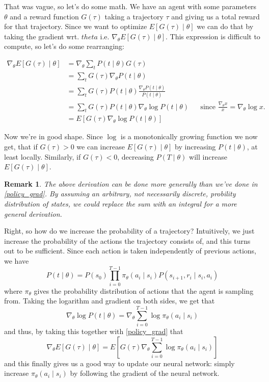 \documentclass{article}
\theoremstyle{changedot}
\theoremstyle{changedotbreak}
\theoremstyle{nonumberplain}
\newtheorem{remark}{Remark}
\begin{document}
That was vague, so let's do some math. We have an agent with some parameters $\theta$ and a reward function $G(\tau)$ taking a trajectory $\tau$ and giving us a total reward for that trajectory. Since we want to optimize $E[G(\tau) \mid \theta]$ we can do that by taking the gradient wrt. $theta$ i.e. $\nabla_{\theta} E[G(\tau) \mid \theta]$. This expression is difficult to compute, so let's do some rearranging:

\begin{equation} \label{policy_grad}
\begin{aligned}
  \nabla_{\theta} E[G(\tau) \mid \theta] &= \nabla_{\theta} \sum_{t}P(t \mid \theta) G(\tau) \\
                                      &= \sum_{t} G(\tau) \nabla_{\theta} P(t \mid \theta)  \\
                                      &= \sum_{t} G(\tau) P(t \mid \theta) \frac{\nabla_{\theta} P(t \mid \theta)}{P(t \mid \theta)} \\
                                      &= \sum_{t} G(\tau) P(t \mid \theta) \nabla_{\theta} \log P(t \mid \theta) && \text{since $\frac{\nabla_{\theta} x}{x} = \nabla_{\theta} \log x$.} \\
                                      &= E[G(\tau) \nabla_{\theta} \log P(t \mid \theta)]
\end{aligned}
\end{equation}

Now we're in good shape. Since $\log$ is a monotonically growing function we now get, that if $G(\tau) > 0$ we can increase $E[G(\tau) \mid \theta]$ by increasing $P(t \mid \theta)$, at least locally. Similarly, if $G(\tau) < 0$, decreasing $P(T \mid \theta)$ will increase $E[G(\tau) \mid \theta]$.

\begin{remark}
  The above derivation can be done more generally than we've done in \ref{policy_grad}. By assuming an arbitrary, not necessarily discrete, probility distribution of states, we could replace the sum with an integral for a more general derivation.
\end{remark}

Right, so how do we increase the probability of a trajectory? Intuitively, we just increase the probability of the actions the trajectory consists of, and this turns out to be sufficient. Since each action is taken independently of previous actions, we have \[P(t \mid \theta) = P(s_{0}) \prod_{i=0}^{T-1} \pi_{\theta}(a_{i} \mid s_{i}) P(s_{i+1}, r_{i} \mid s_{i}, a_{i})\] where $\pi_{\theta}$ gives the probability distribution of actions that the agent is sampling from. Taking the logarithm and gradient on both sides, we get that \[\nabla_{\theta} \log P(t \mid \theta) = \nabla_{\theta} \sum_{i=0}^{T-1} \log \pi_{\theta}(a_{i} \mid s_{i})\] and thus, by taking this together with \ref{policy_grad} that \[\nabla_{\theta} E[G(\tau) \mid \theta] = E\left[ G(\tau) \nabla_{\theta} \sum_{i=0}^{T-1} \log \pi_{\theta} (a_{i} \mid s_{i}) \right]\] and this finally gives us a good way to update our neural network: simply increase $\pi_{\theta} (a_{i} \mid s_{i})$ by following the gradient of the neural network.
\end{document}
